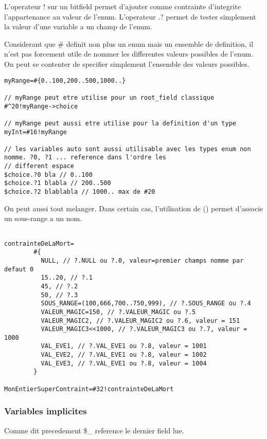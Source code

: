 \documentclass[11pt]{report}
\begin{document}
L'operateur ! sur un bitfield permet d'ajouter comme contrainte d'integrite l'appartenance au valeur de l'enum.
L'operateur .? permet de tester simplement la valeur d'une variable a un champ de l'enum.

Considerant que \#{} definit non plus un enum mais un ensemble de definition, il n'est pas forcement utile de nommer 
les differentes valeurs possibles de l'enum. 
On peut se contenter de specifier simplement l'ensemble des valeurs possibles.

\begin{lstlisting}
myRange=#{0..100,200..500,1000..}

// myRange peut etre utilise pour un root_field classique
#^20!myRange->choice

// myRange peut aussi etre utilise pour la definition d'un type
myInt=#16!myRange

// les variables auto sont aussi utilisable avec les types enum non nomme. ?0, ?1 ... reference dans l'ordre les 
// different espace
$choice.?0 bla // 0..100 
$choice.?1 blabla // 200..500 
$choice.?2 blablabla // 1000.. max de #20 
\end{lstlisting} %

On peut aussi tout melanger. Dans certain cas, l'utilisation de () permet d'associe un sous-range a un nom.

\begin{lstlisting}

contrainteDeLaMort=
        #{
          NULL, // ?.NULL ou ?.0, valeur=premier champs nomme par defaut 0
          15..20, // ?.1
          45, // ?.2
          50, // ?.3
          SOUS_RANGE=(100,666,700..750,999), // ?.SOUS_RANGE ou ?.4
          VALEUR_MAGIC=150, // ?.VALEUR_MAGIC ou ?.5
          VALEUR_MAGIC2, // ?.VALEUR_MAGIC2 ou ?.6, valeur = 151
          VALEUR_MAGIC3<<1000, // ?.VALEUR_MAGIC3 ou ?.7, valeur = 1000 
          VAL_EVE1, // ?.VAL_EVE1 ou ?.8, valeur = 1001
          VAL_EVE2, // ?.VAL_EVE1 ou ?.8, valeur = 1002
          VAL_EVE3, // ?.VAL_EVE1 ou ?.8, valeur = 1004
        }

MonEntierSuperContraint=#32!contrainteDeLaMort
\end{lstlisting} %

\subsubsection{Variables implicites}

Comme dit precedement \$\_ reference le dernier field lue.
\end{document}
